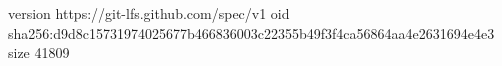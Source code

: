 version https://git-lfs.github.com/spec/v1
oid sha256:d9d8c15731974025677b466836003c22355b49f3f4ca56864aa4e2631694e4e3
size 41809
